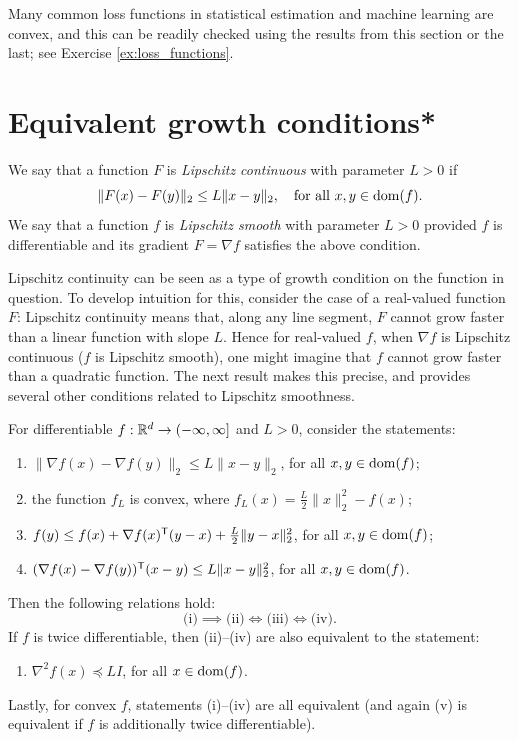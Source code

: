Many common loss functions in statistical estimation and machine learning are
convex, and this can be readily checked using the results from this section or
the last; see Exercise \ref{ex:loss_functions}.             

\section{Equivalent growth conditions*}

We say that a function $F$ is \emph{Lipschitz continuous} with parameter $L>0$
if 
\[
\|F(x) - F(y)\|_2 \leq L \|x-y\|_2, \quad \text{for all $x,y \in
  \operatorname{dom}(f)$}. 
\]
We say that a function $f$ is \emph{Lipschitz smooth} with parameter $L>0$
provided $f$ is differentiable and its gradient $F=\nabla f$ satisfies the above
condition. 

Lipschitz continuity can be seen as a type of growth condition on the function
in question. To develop intuition for this, consider the case of a real-valued
function $F$: Lipschitz continuity means that, along any line segment, $F$
cannot grow faster than a linear function with slope $L$. Hence for real-valued
$f$, when $\nabla f$ is Lipschitz continuous ($f$ is Lipschitz smooth), one
might imagine that $f$ cannot grow faster than a quadratic function. The next 
result makes this precise, and provides several other conditions related to
Lipschitz smoothness.

\begin{Theorem}
\label{thm:lipschitz_smoothness}
For differentiable $f : \mathbb{R}^d \to (-\infty, \infty]$ and $L>0$, consider the
statements:  
\begin{enumerate}[label=(\roman*)]
\item $\|\nabla f(x) - \nabla f(y)\|_2 \leq L \|x-y\|_2$, for all $x,y \in
  \operatorname{dom}(f)$; 
\item the function $f_L$ is convex, where $f_L(x) = \frac{L}{2} \|x\|_2^2 -
  f(x)$;     
\item $f(y) \leq f(x) + \nabla f(x)^{\mathsf{T}} (y-x) + \frac{L}{2} \|y-x\|_2^2$, for all
  $x,y \in \operatorname{dom}(f)$;
\item $(\nabla f(x) - \nabla f(y))^{\mathsf{T}} (x - y) \leq L\|x-y\|_2^2$, for all $x,y
  \in \operatorname{dom}(f)$. 
\end{enumerate}
Then the following relations hold: 
\[
\text{(i)} \implies \text{(ii)} \iff \text{(iii)} \iff \text{(iv)}. 
\]
If $f$ is twice differentiable, then (ii)--(iv) are also equivalent to the
statement:  
\begin{enumerate}
\item[(v)] $\nabla^2 f(x) \preceq LI$, for all $x \in \operatorname{dom}(f)$.
\end{enumerate} 
Lastly, for convex $f$, statements (i)--(iv) are all equivalent (and again (v)
is equivalent if $f$ is additionally twice differentiable).
\end{Theorem}

